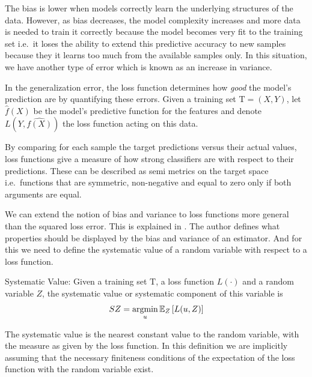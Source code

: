 The bias is lower when models correctly learn the underlying structures of the data. However, as bias decreases, the model complexity increases and more data is needed to train it correctly because the model becomes very fit to the training set i.e.\ it loses the ability to extend this predictive accuracy to new samples because they it learns too much from the available samples only. In this situation, we have another type of error which is known as an increase in variance.

In the generalization error, the loss function determines how \textit{good} the model's prediction are by quantifying these errors. Given a training set $\mathrm{T} = (X,Y)$, let $\hat{f}(X)$ be the model's predictive function for the features and denote $L( Y,\hat{f(X)} )$ the loss function acting on this data.

By comparing for each sample the target predictions versus their actual values, loss functions give a measure of how strong classifiers are with respect to their predictions. These can be described as semi metrics on the target space i.e.\ functions that are symmetric, non-negative and equal to zero only if both arguments are equal.


We can extend the notion of bias and variance to loss functions more general than the squared loss error. This is explained in \textcite{james-biasVarianceGeneral}. The author defines what properties should be displayed by the bias and variance of an estimator. And for this we need to define the systematic value of a random variable with respect to a loss function.


\begin{definition}{Systematic Value:}
Given a training set $\mathrm{T}$, a loss function $L(\cdot)$ and a random variable $Z$, the systematic value or systematic component of this variable is
$$ SZ =  \operatorname*{argmin}_u \operatorname{\mathbb{E}}_{Z} \left[ L(u,Z) \right]$$
\end{definition}

The systematic value is the nearest constant value to the random variable, with the measure as given by the loss function. In this definition we are implicitly assuming that the necessary finiteness conditions of the expectation of the loss function with the random variable exist.


